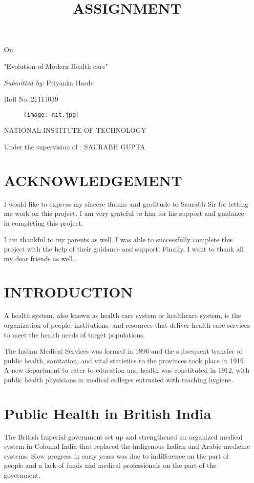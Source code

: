 \documentclass[11pt]{article}
\title{\Huge \textbf{ASSIGNMENT}}
\begin{document}
\maketitle
\centering On

\Huge "Evolution of Modern Health care"
\setlength{\parskip}{0.5em}

\emph{\large Submitted by:}
\large Priyanka Harde

\large Roll No.:21111039
\begin{figure}[h]
\begin{center}
\texttt{[image: nit.jpg]}
\end{center}
\end{figure}

\textsc{\Large NATIONAL INSTITUTE OF TECHNOLOGY}

\large Under the supervision of : SAURABH GUPTA 
\clearpage 
\tableofcontents
\clearpage
\section{\huge  ACKNOWLEDGEMENT}
\Large \raggedright I would like to express my sincere thanks and gratitude to Saurabh Sir for letting me work on this project. I am very grateful to him for his support and guidance in completing this project.

I am thankful to my parents as well. I was able to successfully complete this project with the help of their guidance and support. Finally, I want to thank all my dear friends as well..

\section{\textbf{\huge INTRODUCTION}}
\raggedright \Large A health system, also known as health care system or healthcare system, is the organization of people, institutions, and resources that deliver health care services to meet the health needs of target populations.

The Indian Medical Services was formed in 1896 and the subsequent transfer of public health, sanitation, and vital statistics to the provinces took place in 1919. A new department to cater to education and health was constituted in 1912, with public health physicians in medical colleges entrusted with teaching hygiene.
\section{\huge Public Health in British India}
The British Imperial government set up and strengthened an organized medical system in Colonial India that replaced the indigenous Indian and Arabic medicine systems. Slow progress in early years was due to indifference on the part of people and a lack of funds and medical professionals on the part of the government.
\end{document}
